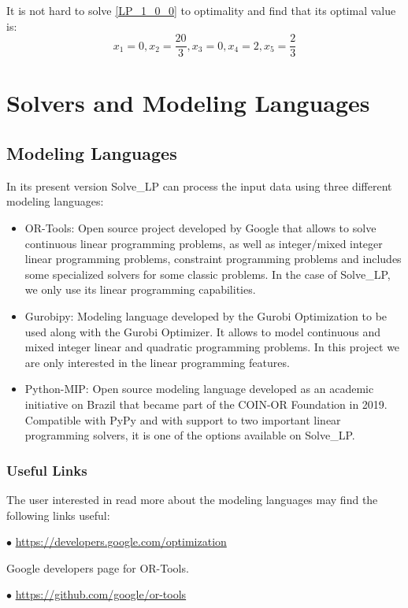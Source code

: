 \documentclass[12pt,hidelinks]{article}
\begin{document}
		It is not hard to solve \eqref{LP_1_0_0} to optimality and find that its optimal value is:
		$$x_1 = 0, x_2 = \frac{20}{3}, x_3 = 0, x_4 = 2, x_5 = \frac{2}{3}$$



\section{Solvers and Modeling Languages}
\vspace{10.5cm}
	\subsection{Modeling Languages}
		In its present version Solve\_LP can process the input data using three different modeling languages:
		\begin{itemize}
			\item OR-Tools: Open source project developed by Google that allows to solve continuous linear programming problems, as well as integer/mixed integer linear programming problems, constraint programming problems and includes some specialized solvers for some classic problems. In the case of Solve\_LP, we only use its linear programming capabilities.
			\item Gurobipy: Modeling language developed by the Gurobi Optimization to be used along with the Gurobi Optimizer. It allows to model continuous and mixed integer linear and quadratic programming problems. In this project we are only interested in the linear programming features.
			\item Python-MIP: Open source modeling language developed as an academic initiative on Brazil that became part of the COIN-OR Foundation in 2019. Compatible with PyPy and with support to two important linear programming solvers, it is one of the options available on Solve\_LP.
		\end{itemize}

	\subsubsection{Useful Links}
		The user interested in read more about the modeling languages may find the following links useful:

		$\bullet$ \url{https://developers.google.com/optimization}

		Google developers page for OR-Tools.

		$\bullet$ \url{https://github.com/google/or-tools}
\end{document}
